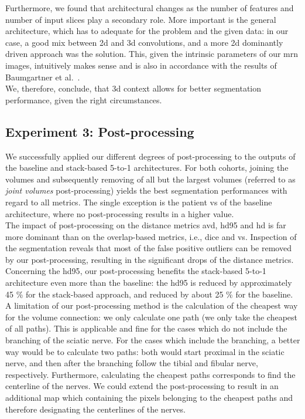 Furthermore, we found that architectural changes as the number of features and number of input slices play a secondary role. More important is the general architecture, which has to adequate for the problem and the given data: in our case, a good mix between \gls{2d} and \gls{3d} convolutions, and a more \gls{2d} dominantly driven approach was the solution. This, given the intrinsic parameters of our \gls{mrn} images, intuitively makes sense and is also in accordance with the results of Baumgartner et al.~\cite{Baumgartner2017AnSegmentation}.\\
We, therefore, conclude, that \gls{3d} context allows for better segmentation performance, given the right circumstances.

\subsection{Experiment 3: Post-processing}
We successfully applied our different degrees of post-processing to the outputs of the baseline and stack-based 5-to-1 architectures. For both cohorts, joining the volumes and subsequently removing of all but the largest volumes (referred to as \textit{joint volumes} post-processing) yields the best segmentation performances with regard to all metrics. The single exception is the patient \acrlong{vs} of the baseline architecture, where no post-processing results in a higher value.\\
The impact of post-processing on the distance metrics \gls{avd}, \gls{hd95} and \gls{hd} is far more dominant than on the overlap-based metrics, i.e., \gls{dice} and \gls{vs}. Inspection of the segmentation reveals that most of the false positive outliers can be removed by our post-processing, resulting in the significant drops of the distance metrics.\\
Concerning the \acrlong{hd95}, our post-processing benefits the stack-based 5-to-1 architecture even more than the baseline: the \gls{hd95} is reduced by approximately 45 \% for the stack-based approach, and reduced by about 25 \% for the baseline.
A limitation of our post-processing method is the calculation of the cheapest way for the volume connection: we only calculate one path (we only take the cheapest of all paths). This is applicable and fine for the cases which do not include the branching of the sciatic nerve. For the cases which include the branching, a better way would be to calculate two paths: both would start proximal in the sciatic nerve, and then after the branching follow the tibial and fibular nerve, respectively.
Furthermore, calculating the cheapest paths corresponds to find the centerline of the nerves. We could extend the post-processing to result in an additional map which containing the pixels belonging to the cheapest paths and therefore designating the centerlines of the nerves.

